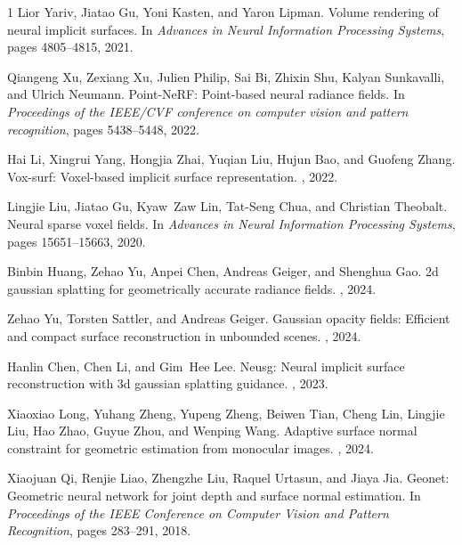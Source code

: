 \begin{thebibliography}{1}
Lior Yariv, Jiatao Gu, Yoni Kasten, and Yaron Lipman.
\newblock Volume rendering of neural implicit surfaces.
\newblock In {\em Advances in Neural Information Processing Systems}, pages 4805--4815, 2021.

Qiangeng Xu, Zexiang Xu, Julien Philip, Sai Bi, Zhixin Shu, Kalyan Sunkavalli, and Ulrich Neumann.
\newblock Point-NeRF: Point-based neural radiance fields.
\newblock In {\em Proceedings of the IEEE/CVF conference on computer vision and pattern recognition}, pages 5438--5448, 2022.

Hai Li, Xingrui Yang, Hongjia Zhai, Yuqian Liu, Hujun Bao, and Guofeng Zhang.
\newblock Vox-surf: Voxel-based implicit surface representation.
, 2022.

Lingjie Liu, Jiatao Gu, Kyaw~Zaw Lin, Tat{-}Seng Chua, and Christian Theobalt.
\newblock Neural sparse voxel fields.
\newblock In {\em Advances in Neural Information Processing Systems}, pages 15651--15663, 2020.

Binbin Huang, Zehao Yu, Anpei Chen, Andreas Geiger, and Shenghua Gao.
\newblock 2d gaussian splatting for geometrically accurate radiance fields.
, 2024.

Zehao Yu, Torsten Sattler, and Andreas Geiger.
\newblock Gaussian opacity fields: Efficient and compact surface reconstruction in unbounded scenes.
, 2024.

Hanlin Chen, Chen Li, and Gim~Hee Lee.
\newblock Neusg: Neural implicit surface reconstruction with 3d gaussian splatting guidance.
, 2023.

Xiaoxiao Long, Yuhang Zheng, Yupeng Zheng, Beiwen Tian, Cheng Lin, Lingjie Liu, Hao Zhao, Guyue Zhou, and Wenping Wang.
\newblock Adaptive surface normal constraint for geometric estimation from monocular images.
, 2024.

Xiaojuan Qi, Renjie Liao, Zhengzhe Liu, Raquel Urtasun, and Jiaya Jia.
\newblock Geonet: Geometric neural network for joint depth and surface normal estimation.
\newblock In {\em Proceedings of the IEEE Conference on Computer Vision and Pattern Recognition}, pages 283--291, 2018.


\end{thebibliography}
